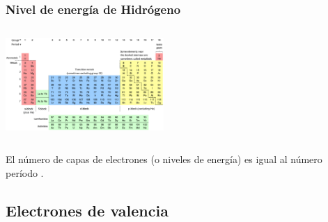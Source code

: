 \documentclass{beamer}
\begin{document}
\begin{frame}


    \frametitle{Nivel de energía de Hidrógeno}
    \begin{columns}
        
        \begin{column}{0.5\textwidth}
            \includegraphics[width=6cm]{../../../../public/images/pTable.png}
            
        \end{column}
        \begin{column}{0.5\textwidth}

            
        \end{column}
    \end{columns}

    \vspace{1cm}

    \onslide El número de capas de electrones
    \pause \alert{}
    \onslide (o niveles de energía) es igual al número
    \pause \alert{período}
    \onslide .


\end{frame}



\subsection{Electrones de valencia}
\end{document}
